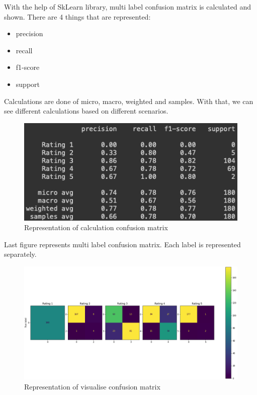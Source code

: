 With the help of SkLearn library, multi label confusion matrix is calculated and shown. There are 4 things that are represented:
\begin{itemize}
    \item precision
    \item recall
    \item f1-score
    \item support
\end{itemize}
Calculations are done of micro, macro, weighted and samples. With that, we can see different calculations based on different scenarios.
\begin{figure}[H]
\includegraphics[scale=0.7]{img/clculationConfusionMatrix.jpeg}
\centering
\caption{Representation of calculation confusion matrix}
\end{figure}
Last figure represents multi label confusion matrix. Each label is represented separately. 
\begin{figure}[H]
\includegraphics[scale=0.39]{img/visualiseConfusionMatrix.jpeg}
\centering
\caption{Representation of visualise confusion matrix}
\end{figure}